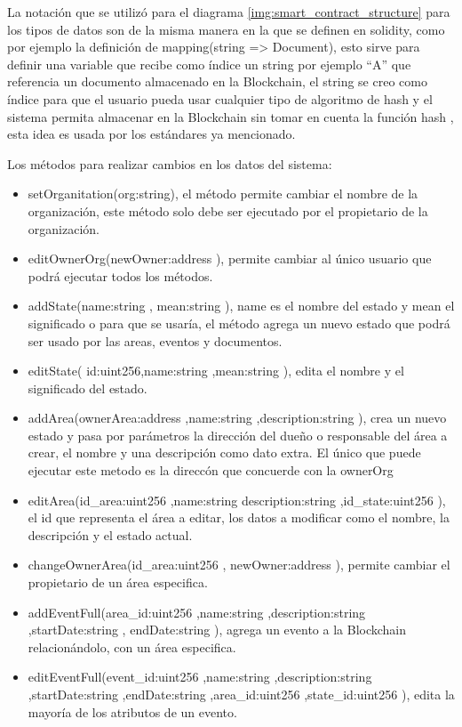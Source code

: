     La notación que se utilizó para el diagrama \ref{img:smart_contract_structure} para los tipos de datos son de la misma manera
    en la que se definen en solidity,
    como por ejemplo la definición de mapping(string => Document), esto sirve para definir  una variable  que recibe como
    índice un string por ejemplo “A” que referencia un documento almacenado en la Blockchain, el string se creo como índice para 
    que el usuario pueda usar cualquier tipo de algoritmo de hash y el sistema permita almacenar en la  Blockchain sin tomar en cuenta la función hash
    , esta idea es usada por los estándares ya mencionado. 

    Los métodos para realizar cambios en los datos del sistema:
    \begin{itemize}
      \item setOrganitation(org:string), el método permite cambiar el nombre de la organización, este método solo debe ser ejecutado por el propietario de la organización.
      \item editOwnerOrg(newOwner:address ), permite cambiar al único usuario que podrá ejecutar todos los métodos.
      \item addState(name:string , mean:string ), name es el nombre del estado y mean el significado o para que se usaría, el método agrega un nuevo estado que podrá ser usado por las areas, eventos y documentos.
      \item editState( id:uint256,name:string ,mean:string ), edita el nombre y el significado del estado.
      \item addArea(ownerArea:address ,name:string ,description:string ), crea un nuevo estado y pasa por parámetros la dirección del dueño o responsable del área a crear, el nombre y una descripción como dato extra. El único que puede ejecutar este metodo es la direccón que concuerde con la ownerOrg
      \item editArea(id\_area:uint256 ,name:string description:string ,id\_state:uint256 ), el id que representa el área a editar, los datos a modificar como el nombre, la descripción y el estado actual.
      \item changeOwnerArea(id\_area:uint256 , newOwner:address ), permite cambiar el propietario de un área especifica.
      \item addEventFull(area\_id:uint256 ,name:string ,description:string ,startDate:string , endDate:string ), agrega un evento a la  Blockchain relacionándolo, con un área especifica.
      \item editEventFull(event\_id:uint256 ,name:string ,description:string ,startDate:string ,endDate:string ,area\_id:uint256 ,state\_id:uint256 ), edita la mayoría de los atributos de un evento.

\end{itemize}
